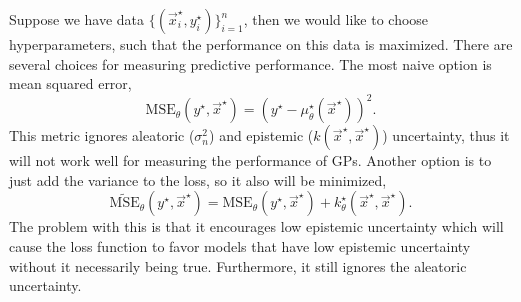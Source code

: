 Suppose we have data $\{(\vec{x}_i^\star,y_i^\star)\}_{i=1}^n$, then we would
like to choose hyperparameters, such that the performance on this data is
maximized. There are several choices for measuring predictive performance.
The most naive option is mean squared error, \[
  \text{MSE}_{\theta}(y^\star,\vec{x}^\star) = (y^\star - \mu_{\theta}^\star(\vec{x}^\star))^2
.\]
This metric ignores aleatoric ($\sigma_n^2$) and epistemic
($k(\vec{x}^\star,\vec{x}^\star)$) uncertainty, thus it will not work well for
measuring the performance of GPs. Another option is to just add the variance
to the loss, so it also will be minimized, \[
  \tilde{\text{MSE}}_{\theta}(y^\star,\vec{x}^\star) = \text{MSE}_{\theta}(y^\star,\vec{x}^\star) + k_{\theta}^\star(\vec{x}^\star,\vec{x}^\star)
.\]
The problem with this is that it encourages low epistemic uncertainty which
will cause the loss function to favor models that have low epistemic
uncertainty without it necessarily being true. Furthermore, it still ignores
the aleatoric uncertainty.

